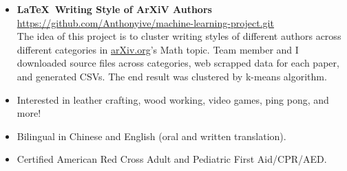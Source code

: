 \documentclass{article}
\newcommand{\insertvspace}{%
	\rlap{\color{white}\rule{.4pt}{.7\baselineskip}}%
	\vspace{\baselineskip}}%
\begin{document}
	\insertvspace
	\noindent
	\begin{minipage}[t]{0.5\textwidth}
		\begin{itemize}[leftmargin=*]
			\item[] 
			\textbf{\LaTeX\ Writing Style of ArXiV Authors} \\
			{\color{Cerulean} \href{https://github.com/Anthonyive/machine-learning-project.git}{https://github.com/Anthonyive/machine-learning-project.git}} \\
			The idea of this project is to cluster writing styles of different authors across different categories in \href{https://arxiv.org}{arXiv.org}'s Math topic. Team member and I downloaded source files across categories, web scrapped data for each paper, and generated CSVs. The end result was clustered by k-means algorithm.
		\end{itemize}
	\end{minipage}\hspace{0.3in}  %
	\begin{minipage}[t]{0.45\textwidth}
		\begin{itemize}[leftmargin=*]
			\item 
			Interested in leather crafting, wood working, video games, ping pong, and more!
			\item
			Bilingual in Chinese and English (oral and written translation).
			\item
			Certified American Red Cross Adult and Pediatric First Aid/CPR/AED.
		\end{itemize}
	\end{minipage}
	
\end{document}
